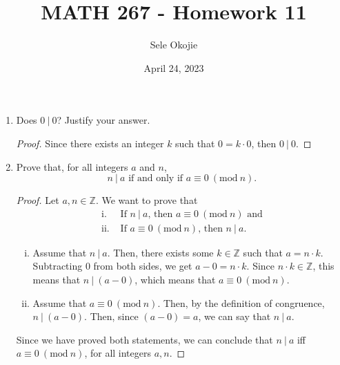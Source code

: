 \documentclass{article}
\title{MATH 267 - Homework 11}
\author{Sele Okojie}
\date{April 24, 2023}
\begin{document}
    \maketitle
    
    \begin{enumerate}

    	\item Does $0\ |\ 0$?  Justify your answer.
                \begin{proof}
                    Since there exists an integer $k$ such that $0 = k \cdot 0$, then $0\ |\ 0$.
                \end{proof}

    	\item Prove that, for all integers $a$ and $n$,
    		\[
    			n\ |\ a \text{ if and only if } a \equiv 0\ (\mathrm{mod}\ n).
    		\]
                \begin{proof}
                    Let $a, n\in\mathbb{Z}$. We want to prove that 
                    \begin{align*}
                        \text{i. }   & \text{If $n\ |\ a$, then $a \equiv 0\ (\mathrm{mod}\ n)$ and}  \\
                        \text{ii. }  & \text{If $a \equiv 0\ (\mathrm{mod}\ n)$, then $n\ |\ a$.}
                    \end{align*}
                                
                    \begin{enumerate}[i.]
                        \item Assume that $n\ |\ a$. Then, there exists some $k\in\mathbb{Z}$ such that $a = n\cdot k$. Subtracting $0$ from both sides, we get $a - 0 = n\cdot k$. Since $n\cdot k\in\mathbb{Z}$, this means that $n\ |\ (a - 0)$, which means that $a \equiv 0\ (\mathrm{mod}\  n)$. \\
                                    
                        \item Assume that $a \equiv 0\ (\mathrm{mod}\ n)$. Then, by the definition of congruence, $n\ |\ (a - 0)$. Then, since $(a - 0) = a$, we can say that $n\ |\ a$.
                    \end{enumerate}
                    Since we have proved both statements, we can conclude that $n\ |\ a$ iff $a \equiv 0\ (\mathrm{mod}\ n)$, for all integers $a, n$.
                \end{proof}


\end{enumerate}
\end{document}

